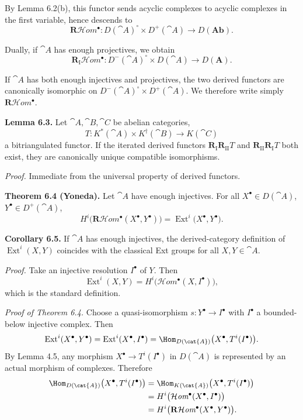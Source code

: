 By Lemma 6.2(b), this functor sends acyclic complexes to acyclic complexes in the first variable,
hence descends to
\[
\mathbf{R}\mathcal{H}\textit{om}^\bullet
\colon D(\cat{A})^\circ \times D^+(\cat{A}) \to D(\mathbf{Ab}).
\]

Dually, if \(\cat{A}\) has enough projectives, we obtain
\[
\mathbf{R}_\mathrm{I}\mathcal{H}\textit{om}^\bullet
\colon D^-(\cat{A})^\circ \times D(\cat{A}) \to D(\mathbf{A}).
\]

\setcounter{page}{66}
If \(\cat{A}\) has both enough injectives and projectives, the two derived functors
are canonically isomorphic on \(D^-(\cat{A})^\circ\times D^+(\cat{A})\).
We therefore write simply \(\mathbf{R}\mathcal{H}\textit{om}^\bullet\).

\textbf{Lemma 6.3.}
Let \(\cat{A},\cat{B},\cat{C}\) be abelian categories,
\[
T\colon K^*(\cat{A})\times K^\dagger(\cat{B})\to K(\cat{C})
\]
a bitriangulated functor.
If the iterated derived functors \(\mathbf{R}_\mathrm{I}\mathbf{R}_\mathrm{II}T\) and \(\mathbf{R}_\mathrm{II}\mathbf{R}_\mathrm{I}T\) both exist,
they are canonically unique compatible isomorphisms.

\textit{Proof.} Immediate from the universal property of derived functors.

\textbf{Theorem 6.4 (Yoneda).}
Let \(\cat{A}\) have enough injectives.
For all \(X^\bullet\in D(\cat{A})\), \(Y^\bullet\in D^+(\cat{A})\),
\[
H^i\big(\mathbf{R}\mathcal{H}\textit{om}^\bullet(X^\bullet,Y^\bullet)\big)
= \operatorname{Ext}^i\big(X^\bullet,Y^\bullet\big).
\]

\textbf{Corollary 6.5.}
If \(\cat{A}\) has enough injectives, the derived-category definition of \(\operatorname{Ext}^i(X,Y)\)
coincides with the classical Ext groups for all \(X,Y\in\cat{A}\).

\textit{Proof.}
Take an injective resolution \(I^\bullet\) of \(Y\). Then
\[
\operatorname{Ext}^i(X,Y) = H^i\big(\mathcal{H}\textit{om}^\bullet(X,I^\bullet)\big),
\]
which is the standard definition.

\setcounter{page}{67}
\textit{Proof of Theorem 6.4.}
Choose a quasi-isomorphism \(s\colon Y^\bullet\to I^\bullet\) with \(I^\bullet\) a bounded-below injective complex. Then
\[
\operatorname{Ext}^i(X^\bullet,Y^\bullet)
= \operatorname{Ext}^i(X^\bullet,I^\bullet)
= \Hom_{D(\cat{A})}\big(X^\bullet,T^i(I^\bullet)\big).
\]
By Lemma 4.5, any morphism \(X^\bullet\to T^i(I^\bullet)\) in \(D(\cat{A})\)
is represented by an actual morphism of complexes. Therefore
\[
\begin{aligned}
\Hom_{D(\cat{A})}\big(X^\bullet,T^i(I^\bullet)\big)
&= \Hom_{K(\cat{A})}\big(X^\bullet,T^i(I^\bullet)\big) \\
&= H^i\big(\mathcal{H}\textit{om}^\bullet(X^\bullet,I^\bullet)\big) \\
&= H^i\big(\mathbf{R}\mathcal{H}\textit{om}^\bullet(X^\bullet,Y^\bullet)\big).
\end{aligned}
\]